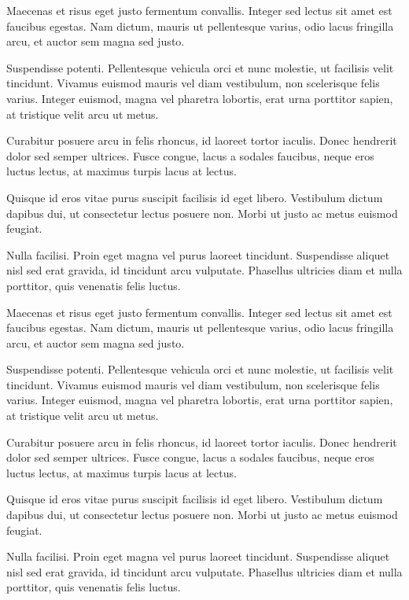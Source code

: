 Maecenas et risus eget justo fermentum convallis. Integer sed lectus sit amet est faucibus egestas. Nam dictum, mauris ut pellentesque varius, odio lacus fringilla arcu, et auctor sem magna sed justo.

Suspendisse potenti. Pellentesque vehicula orci et nunc molestie, ut facilisis velit tincidunt. Vivamus euismod mauris vel diam vestibulum, non scelerisque felis varius. Integer euismod, magna vel pharetra lobortis, erat urna porttitor sapien, at tristique velit arcu ut metus.

Curabitur posuere arcu in felis rhoncus, id laoreet tortor iaculis. Donec hendrerit dolor sed semper ultrices. Fusce congue, lacus a sodales faucibus, neque eros luctus lectus, at maximus turpis lacus at lectus.

Quisque id eros vitae purus suscipit facilisis id eget libero. Vestibulum dictum dapibus dui, ut consectetur lectus posuere non. Morbi ut justo ac metus euismod feugiat.

Nulla facilisi. Proin eget magna vel purus laoreet tincidunt. Suspendisse aliquet nisl sed erat gravida, id tincidunt arcu vulputate. Phasellus ultricies diam et nulla porttitor, quis venenatis felis luctus.

Maecenas et risus eget justo fermentum convallis. Integer sed lectus sit amet est faucibus egestas. Nam dictum, mauris ut pellentesque varius, odio lacus fringilla arcu, et auctor sem magna sed justo.

Suspendisse potenti. Pellentesque vehicula orci et nunc molestie, ut facilisis velit tincidunt. Vivamus euismod mauris vel diam vestibulum, non scelerisque felis varius. Integer euismod, magna vel pharetra lobortis, erat urna porttitor sapien, at tristique velit arcu ut metus.

Curabitur posuere arcu in felis rhoncus, id laoreet tortor iaculis. Donec hendrerit dolor sed semper ultrices. Fusce congue, lacus a sodales faucibus, neque eros luctus lectus, at maximus turpis lacus at lectus.

Quisque id eros vitae purus suscipit facilisis id eget libero. Vestibulum dictum dapibus dui, ut consectetur lectus posuere non. Morbi ut justo ac metus euismod feugiat.

Nulla facilisi. Proin eget magna vel purus laoreet tincidunt. Suspendisse aliquet nisl sed erat gravida, id tincidunt arcu vulputate. Phasellus ultricies diam et nulla porttitor, quis venenatis felis luctus.

\cite{@7479-ALBERTO2025}

\parencite{@7479-ALBERTO2025}

\ifPDF
{}
\fi

